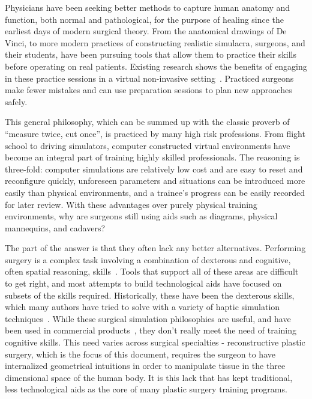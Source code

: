 Physicians have been seeking better methods to capture human anatomy
and function, both normal and pathological, for the purpose of healing
since the earliest days of modern surgical theory. From the anatomical
drawings of De Vinci, to more modern practices of constructing
realistic simulacra, surgeons, and their students, have been pursuing
tools that allow them to practice their skills before operating on
real patients. Existing research shows the benefits of engaging in
these practice sessions in a virtual non-invasive
setting~\citep{GallaRCHFMSS:2005}. Practiced surgeons make fewer
mistakes and can use preparation sessions to plan new approaches
safely.

This general philosophy, which can be summed up with the classic
proverb of ``measure twice, cut once'', is practiced by many high risk
professions. From flight school to driving simulators, computer
constructed virtual environments have become an integral part of
training highly skilled professionals. The reasoning is three-fold:
computer simulations are relatively low cost and are easy to reset and
reconfigure quickly, unforeseen parameters and situations can be
introduced more easily than physical environments, and a trainee's
progress can be easily recorded for later review. With these
advantages over purely physical training environments, why are
surgeons still using aids such as diagrams, physical mannequins, and
cadavers?

The part of the answer is that they often lack any better
alternatives. Performing surgery is a complex task involving a
combination of dexterous and cognitive, often spatial reasoning,
skills~\citep{GallaRCHFMSS:2005}. Tools that support all of these areas
are difficult to get right, and most attempts to build technological
aids have focused on subsets of the skills required. Historically,
these have been the dexterous skills, which many authors have tried to
solve with a variety of haptic simulation
techniques~\citep{MendoL:2003, LindbT:2007}. While these surgical
simulation philosophies are useful, and have been used in commercial
products~\citep{SUSAC:2002--2014}, they don't really meet the need of
training cognitive skills. This need varies across surgical
specialties - reconstructive plastic surgery, which is the focus of this document,
requires the surgeon to have internalized geometrical intuitions in
order to manipulate tissue in the three dimensional space of the human
body. It is this lack that has kept traditional, less technological
aids as the core of many plastic surgery training programs.

